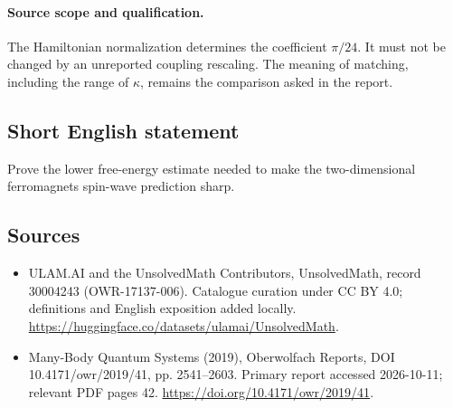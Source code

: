 \documentclass[11pt]{article}
\begin{document}
\paragraph{Source scope and qualification.}
The Hamiltonian normalization determines the coefficient $\pi/24$. It must not be changed by an unreported coupling rescaling. The meaning of matching, including the range of $\kappa$, remains the comparison asked in the report.
\subsection{Short English statement}
Prove the lower free-energy estimate needed to make the two-dimensional ferromagnet\textquotesingle s spin-wave prediction sharp.
\subsection{Sources}
\begin{itemize}
\item[\hypertarget{source:30004243:1}{S1}] ULAM.AI and the UnsolvedMath Contributors, UnsolvedMath, record 30004243 (OWR-17137-006). Catalogue curation under CC BY 4.0; definitions and English exposition added locally.
\url{https://huggingface.co/datasets/ulamai/UnsolvedMath}.
\item[\hypertarget{source:30004243:2}{S2}] Many-Body Quantum Systems (2019), Oberwolfach Reports, DOI 10.4171/owr/2019/41, pp. 2541--2603. Primary report accessed 2026-10-11; relevant PDF pages 42.
\url{https://doi.org/10.4171/owr/2019/41}.
\end{itemize}
\label{end:30004243}
\end{document}

